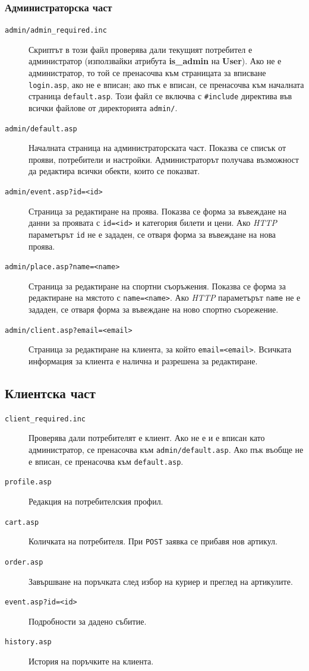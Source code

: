 \documentclass[a4paper,10pt, leqno]{article}
\newcommand{\term}[1] {\textsl{#1}}
\newcommand{\tab}[1] {\textbf{#1}}
\newcommand{\col}[1] {\textbf{#1}}
\newcommand{\File}[1] {\texttt{#1}}
\begin{document}
		\subsubsection{Администраторска част}
		\begin{description}
		  \item[\File{admin/admin\_required.inc}]
		    Скриптът в този файл проверява дали текущият потребител е администратор (използвайки атрибута \col{is\_admin} на \tab{User}).
		    Ако не е администратор, то той се пренасочва към страницата
		    за вписване \File{login.asp}, ако не е вписан; ако пък е вписан, се пренасочва към началната страница \File{default.asp}.
		    Този файл се включва с \texttt{\#include} директива във всички файлове от директорията \File{admin/}.
		  \item[\File{admin/default.asp}]
		    Началната страница на администраторската част. Показва се списък от прояви, потребители и настройки.
		    Администраторът получава възможност да редактира всички обекти, които се показват.
		  \item[\File{admin/event.asp?id=<id>}]
		    Страница за редактиране на проява. Показва се форма за въвеждане на данни за проявата с \texttt{id=<id>} и категория билети и цени.
		    Ако \term{HTTP} параметърът \texttt{id} не е зададен, се отваря форма за въвеждане на нова проява.
		  \item[\File{admin/place.asp?name=<name>}]
		    Страница за редактиране на спортни съоръжения. Показва се форма за редактиране на мястото с \texttt{name=<name>}.
		    Ако \term{HTTP} параметърът \texttt{name} не е зададен, се отваря форма за въвеждане на ново спортно съорежение.
		  \item[\File{admin/client.asp?email=<email>}]
		    Страница за редактиране на клиента, за който \texttt{email=<email>}.
		    Всичката информация за клиента е налична и разрешена за редактиране.
		\end{description}

		\subsection{Клиентска част}
		  \begin{description}
		    \item[\File{client\_required.inc}]
		      Проверява дали потребителят е клиент. Ако не е и е вписан като администратор, се пренасочва към \File{admin/default.asp}.
		      Ако пък въобще не е вписан, се пренасочва към \File{default.asp}.
		    \item[\File{profile.asp}]
		      Редакция на потребителския профил.
		    \item[\File{cart.asp}]
		      Количката на потребителя.
		      При \texttt{POST} заявка се прибавя нов артикул.
		    \item[\File{order.asp}]
		      Завършване на поръчката след избор на куриер и преглед на артикулите.
		    \item[\File{event.asp?id=<id>}]
		      Подробности за дадено събитие.
		    \item[\File{history.asp}]
		      История на поръчките на клиента.
		  \end{description}
\end{document}
